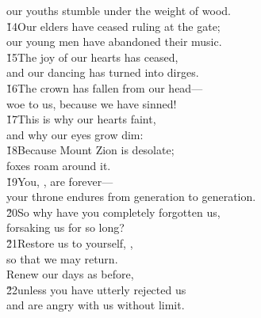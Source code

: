\begin{poetry}
\poemll    our youths stumble under the weight of wood. \\
\poeml \v{14}Our elders have ceased ruling at the gate; \\
\poemll    our young men have abandoned their music. \\
\poeml \v{15}The joy of our hearts has ceased, \\
\poemll    and our dancing has turned into dirges. \\
\poeml \v{16}The crown has fallen from our head--- \\
\poemll    woe to us, because we have sinned! \\
\poeml \v{17}This is why our hearts faint, \\
\poemll    and why our eyes grow dim: \\
\poeml \v{18}Because Mount Zion is desolate; \\
\poemll    foxes roam around it. \\
\poeml \v{19}You, , are forever--- \\
\poemll    your throne endures from generation to generation. \\
\poeml \v{20}So why have you completely forgotten us, \\
\poemll    forsaking us for so long? \\
\poeml \v{21}Restore us to yourself, , \\
\poemll    so that we may return. \\
\poeml Renew our days as before, \\
\poeml \v{22}unless you have utterly rejected us \\
\poemlll       and are angry with us without limit.\end{poetry}

